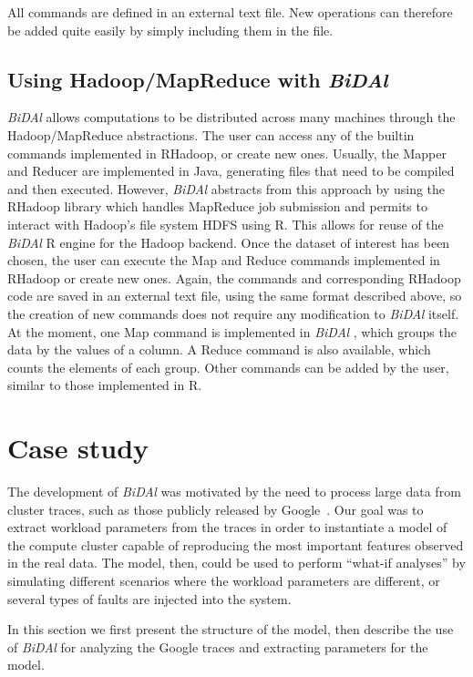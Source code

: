 \documentclass{article}
\begin{document}
All commands are defined in an external text file. New operations can therefore be added quite easily by simply including them in the file.

\subsection{Using Hadoop/MapReduce with \emph{BiDAl} }

\emph{BiDAl}  allows computations to be distributed across many machines through the Hadoop/MapReduce abstractions. The user can access any of the builtin commands implemented in RHadoop, or create new ones. Usually, the Mapper and Reducer are implemented in Java, generating files that need to be compiled and then executed. However, \emph{BiDAl}  abstracts from this approach by using the RHadoop library which handles MapReduce job submission and permits to interact with Hadoop's file system HDFS using R. This allows for reuse of the \emph{BiDAl}  R engine for the Hadoop backend. Once the dataset of interest has been chosen, the user can execute the Map and Reduce commands implemented in RHadoop or create new ones. Again, the commands and corresponding RHadoop code are saved in an external text file, using the same format described above, so the creation of new commands does not require any modification to \emph{BiDAl}  itself. At the moment, one Map command is implemented in \emph{BiDAl} , which groups the data by the values of a column. A Reduce command is also available, which counts the elements of each group. Other commands can be added by the user, similar to those implemented in R. 


\section{Case study}
\label{sec:sim}

The development of \emph{BiDAl} was motivated by the need to process large data from cluster traces, such as those publicly released by Google~\cite{googleData}. Our goal was to extract workload parameters from the traces in order to instantiate a model of the compute cluster capable of reproducing the most important features observed in the real data. The model, then, could be used to perform ``what-if analyses'' by simulating different scenarios where the workload parameters are different, or several types of faults are injected into the system.

In this section we first present the structure of the model, then describe the use of \emph{BiDAl}  for analyzing the Google traces and extracting parameters for the model.
\end{document}
